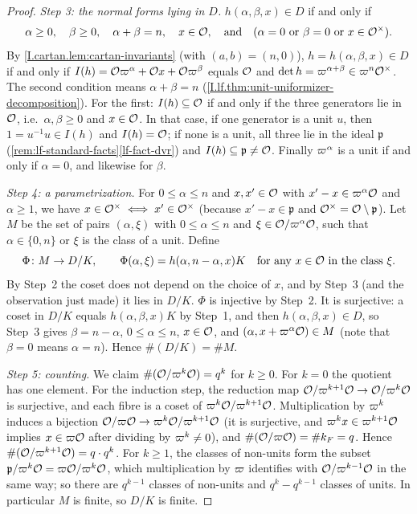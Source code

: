 \begin{proof}
\emph{Step 3: the normal forms lying in $D$.} $h(\alpha,\beta,x)\in D$ if and only if
\[
  \alpha\ge0,\quad\beta\ge0,\quad\alpha+\beta=n,\quad x\in\mathcal{O},\quad\text{and}\quad
  (\alpha=0\ \text{or}\ \beta=0\ \text{or}\ x\in\mathcal{O}^\times).
\]
By \cref{I.cartan.lem:cartan-invariants} (with $(a,b)=(n,0)$), $h=h(\alpha,\beta,x)\in D$ if and only if
$I(h)=\mathcal{O}\varpi^\alpha+\mathcal{O} x+\mathcal{O}\varpi^\beta$ equals $\mathcal{O}$ and $\det h=\varpi^{\alpha+\beta}\in\varpi^n\mathcal{O}^\times$.
The second condition means $\alpha+\beta=n$ (\cref{I.lf.thm:unit-uniformizer-decomposition}). For the first:
$I(h)\subseteq\mathcal{O}$ if and only if the three generators lie in $\mathcal{O}$, i.e.\ $\alpha,\beta\ge0$ and $x\in\mathcal{O}$. In
that case, if one generator is a unit $u$, then $1=u^{-1}u\in I(h)$ and $I(h)=\mathcal{O}$; if none is a unit, all three lie
in the ideal $\mathfrak p$ (\cref{rem:lf-standard-facts}\ref{lf-fact-dvr}) and $I(h)\subseteq\mathfrak p\neq\mathcal{O}$.
Finally $\varpi^\alpha$ is a unit if and only if $\alpha=0$, and likewise for $\beta$.

\emph{Step 4: a parametrization.} For $0\le\alpha\le n$ and $x,x'\in\mathcal{O}$ with $x'-x\in\varpi^\alpha\mathcal{O}$ and
$\alpha\ge1$, we have $x\in\mathcal{O}^\times\iff x'\in\mathcal{O}^\times$ (because $x'-x\in\mathfrak p$ and
$\mathcal{O}^\times=\mathcal{O}\setminus\mathfrak p$). Let $M$ be the set of pairs $(\alpha,\xi)$ with $0\le\alpha\le n$ and
$\xi\in\mathcal{O}/\varpi^\alpha\mathcal{O}$, such that $\alpha\in\{0,n\}$ or $\xi$ is the class of a unit. Define
\[
  \Phi\colon M\to D/K,\qquad \Phi(\alpha,\xi)=h(\alpha,n-\alpha,x)K\quad\text{for any }x\in\mathcal{O}\text{ in the class }\xi.
\]
By Step~2 the coset does not depend on the choice of $x$, and by Step~3 (and the observation just made) it lies in
$D/K$. $\Phi$ is injective by Step~2. It is surjective: a coset in $D/K$ equals $h(\alpha,\beta,x)K$ by Step~1, and
then $h(\alpha,\beta,x)\in D$, so Step~3 gives $\beta=n-\alpha$, $0\le\alpha\le n$, $x\in\mathcal{O}$, and
$(\alpha,x+\varpi^\alpha\mathcal{O})\in M$ (note that $\beta=0$ means $\alpha=n$). Hence $\#(D/K)=\#M$.

\emph{Step 5: counting.} We claim $\#(\mathcal{O}/\varpi^k\mathcal{O})=q^k$ for $k\ge0$. For $k=0$ the quotient has one element.
For the induction step, the reduction map $\mathcal{O}/\varpi^{k+1}\mathcal{O}\to\mathcal{O}/\varpi^k\mathcal{O}$ is surjective, and each fibre
is a coset of $\varpi^k\mathcal{O}/\varpi^{k+1}\mathcal{O}$. Multiplication by $\varpi^k$ induces a bijection
$\mathcal{O}/\varpi\mathcal{O}\to\varpi^k\mathcal{O}/\varpi^{k+1}\mathcal{O}$ (it is surjective, and $\varpi^kx\in\varpi^{k+1}\mathcal{O}$ implies
$x\in\varpi\mathcal{O}$ after dividing by $\varpi^k\neq0$), and $\#(\mathcal{O}/\varpi\mathcal{O})=\#k_F=q$. Hence
$\#(\mathcal{O}/\varpi^{k+1}\mathcal{O})=q\cdot q^k$. For $k\ge1$, the classes of non-units form the subset
$\mathfrak p/\varpi^k\mathcal{O}=\varpi\mathcal{O}/\varpi^k\mathcal{O}$, which multiplication by $\varpi$ identifies with
$\mathcal{O}/\varpi^{k-1}\mathcal{O}$ in the same way; so there are $q^{k-1}$ classes of non-units and $q^k-q^{k-1}$ classes of
units. In particular $M$ is finite, so $D/K$ is finite.


\end{proof}
